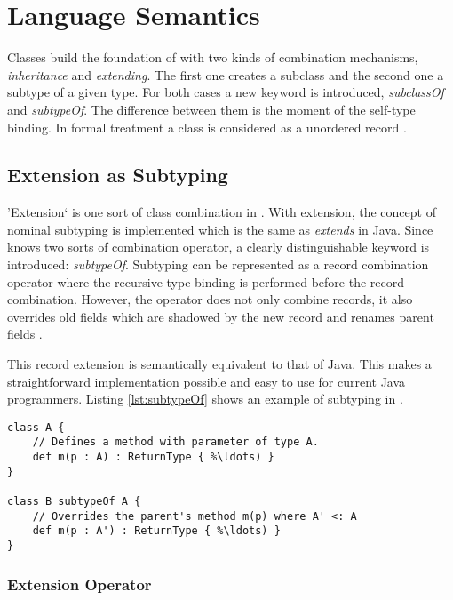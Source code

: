 \section{Language Semantics}
Classes build the foundation of \ooplss with two kinds of combination
mechanisms, \emph{inheritance} and \emph{extending}. The first
one creates a subclass and the second one a subtype of a given
type. For both cases a new keyword is introduced, \emph{subclassOf}
and \emph{subtypeOf}. The difference between them is the moment of
the self-type binding. In formal treatment a class is considered as a
unordered record \cite{simons_theory_2002-1}.

\subsection{Extension as Subtyping}
'Extension` is one sort of class combination in \ooplss. With extension,
the concept of nominal subtyping is implemented which is the same as
\emph{extends} in Java.  Since \ooplss knows two sorts of combination operator, a
clearly distinguishable keyword is introduced: \emph{subtypeOf}. Subtyping
can be represented as a record combination operator where the recursive type binding
is performed before the record combination.  However, the operator does
not only combine records, it also overrides old fields which are shadowed
by the new record and renames parent fields \cite{simons_theory_2003-2}.

This record extension is semantically equivalent to that of Java. This
makes a straightforward implementation possible and easy to use for
current Java programmers. Listing \ref{lst:subtypeOf} shows an example
of subtyping in \ooplss.

\begin{lstlisting}[float,language=ooplss,caption=Subtyping in \ooplss,label=lst:subtypeOf]
class A {
	// Defines a method with parameter of type A.
	def m(p : A) : ReturnType { %\ldots) }
}

class B subtypeOf A {
	// Overrides the parent's method m(p) where A' <: A
	def m(p : A') : ReturnType { %\ldots) }
}
\end{lstlisting}


\subsubsection{Extension Operator}

